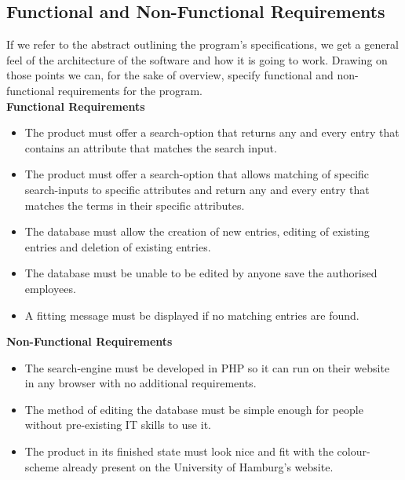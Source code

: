 \documentclass[12pt,a4paper]{article}
\begin{document}
\subsection{Functional and Non-Functional Requirements}

If we refer to the abstract outlining the program's specifications, we get a general feel of the architecture of the software and how it is going to work. Drawing on those points we can, for the sake of overview, specify functional and non-functional requirements for the program.\\

{\bf Functional Requirements}
\begin{itemize}
	\item The product must offer a search-option that returns any and every entry that contains an attribute that matches the search input.
	\item The product must offer a search-option that allows matching of specific search-inputs to specific attributes and return any and every entry that matches the terms in their specific attributes.
	\item The database must allow the creation of new entries, editing of existing entries and deletion of existing entries.
	\item The database must be unable to be edited by anyone save the authorised employees.
	\item A fitting message must be displayed if no matching entries are found.\\
\end{itemize}
{\bf Non-Functional Requirements}
\begin{itemize}
	\item The search-engine must be developed in PHP so it can run on their website in any browser with no additional requirements.
	\item The method of editing the database must be simple enough for people without pre-existing IT skills to use it.
	\item The product in its finished state must look nice and fit with the colour-scheme already present on the University of Hamburg's website.
\end{itemize}
\newpage
\end{document}
